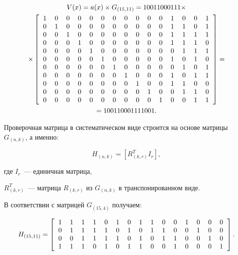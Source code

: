\begin{gather*}
  V(x) = a(x) \times G_{(15, 11)} = 10011000111 \times \\
  \times\left[\begin{tabular}{l*{15}{c}r}
      1 & 0 & 0 & 0 & 0 & 0 & 0 & 0 & 0 & 0 & 0 & 1 & 0 & 0 & 1\\
      0 & 1 & 0 & 0 & 0 & 0 & 0 & 0 & 0 & 0 & 0 & 1 & 1 & 0 & 1\\ 
      0 & 0 & 1 & 0 & 0 & 0 & 0 & 0 & 0 & 0 & 0 & 1 & 1 & 1 & 1\\ 
      0 & 0 & 0 & 1 & 0 & 0 & 0 & 0 & 0 & 0 & 0 & 1 & 1 & 1 & 0\\ 
      0 & 0 & 0 & 0 & 1 & 0 & 0 & 0 & 0 & 0 & 0 & 0 & 1 & 1 & 1\\ 
      0 & 0 & 0 & 0 & 0 & 1 & 0 & 0 & 0 & 0 & 0 & 1 & 0 & 1 & 0\\ 
      0 & 0 & 0 & 0 & 0 & 0 & 1 & 0 & 0 & 0 & 0 & 0 & 1 & 0 & 1\\ 
      0 & 0 & 0 & 0 & 0 & 0 & 0 & 1 & 0 & 0 & 0 & 1 & 0 & 1 & 1\\ 
      0 & 0 & 0 & 0 & 0 & 0 & 0 & 0 & 1 & 0 & 0 & 1 & 1 & 0 & 0\\ 
      0 & 0 & 0 & 0 & 0 & 0 & 0 & 0 & 0 & 1 & 0 & 0 & 1 & 1 & 0\\ 
      0 & 0 & 0 & 0 & 0 & 0 & 0 & 0 & 0 & 0 & 1 & 0 & 0 & 1 & 1
    \end{tabular}\right] = \\
  = 100110001111001.
\end{gather*}

Проверочная матрица в систематическом виде строится на основе матрицы
$G_{(n,k)}$, а именно:

\begin{equation*}
  H_{(n, k)} = \left[R^T_{(k, r)} I_r \right],
\end{equation*}

\begin{ESKDexplanation}
\item[где ]  $I_r$~--- единичная матрица, 
\item $R^T_{(k, r)}$~--- матрица $R_{(k, r)}$ из
$G_{(n,k)}$ в транспонированном виде. 
\end{ESKDexplanation}
  
В соответствии с матрицей $G_{(15,4)}$ получаем:

\begin{equation*}
  H_{(15, 11)} =  \left[
    \begin{tabular}{l*{15}{c}r}
      1 & 1 & 1 & 1 & 0 & 1 & 0 & 1 & 1 & 0 & 0 & 1 & 0 & 0 & 0\\
      0 & 1 & 1 & 1 & 1 & 0 & 1 & 0 & 1 & 1 & 0 & 0 & 1 & 0 & 0\\ 
      0 & 0 & 1 & 1 & 1 & 1 & 0 & 1 & 0 & 1 & 1 & 0 & 0 & 1 & 0\\ 
      1 & 1 & 1 & 0 & 1 & 0 & 1 & 1 & 0 & 0 & 1 & 0 & 0 & 0 & 1\\ 
    \end{tabular}
  \right].
\end{equation*}


